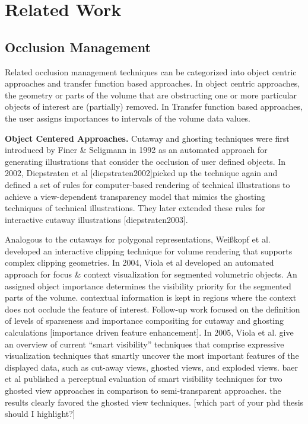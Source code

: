 \section{Related Work}


\subsection{Occlusion Management}
Related occlusion management techniques can be categorized into object centric approaches and transfer function based approaches. In object centric approaches, the geometry or parts of the volume that are obstructing one or more particular objects of interest are (partially) removed. In Transfer function based approaches, the user assigns importances to intervals of the volume data values.

\noindent
\textbf{Object Centered Approaches.}
Cutaway and ghosting techniques were first introduced by Finer \& Seligmann in 1992 as an automated approach for generating illustrations that consider the occlusion of user defined objects. In 2002, Diepstraten et al [diepstraten2002]picked up the technique again and defined a set of rules for computer-based rendering of technical illustrations to achieve a view-dependent transparency model that mimics the ghosting techniques of technical illustrations. They later extended these rules for interactive cutaway illustrations [diepstraten2003].

Analogous to the cutaways for polygonal representations, Weißkopf et al. developed an interactive clipping technique for volume rendering that supports complex clipping geometries.  In 2004, Viola et al developed an automated approach for focus \& context visualization for segmented volumetric objects. An assigned object importance determines the visibility priority for the segmented parts of the volume. contextual information is kept in regions where the context does not occlude the feature of interest. Follow-up work focused on the definition of levels of sparseness and importance compositing for cutaway and ghosting calculations [importance driven feature enhancement]. 
In 2005, Viola et al. give an overview of current “smart visibility” techniques that comprise expressive visualization techniques that smartly uncover the most important features of the displayed data, such as cut-away views, ghosted views, and exploded views. baer et al published a perceptual evaluation of smart visibility techniques for two ghosted view approaches in comparison to semi-transparent approaches. the results clearly favored the ghosted view techniques.
[which part of your phd thesis should I highlight?]

